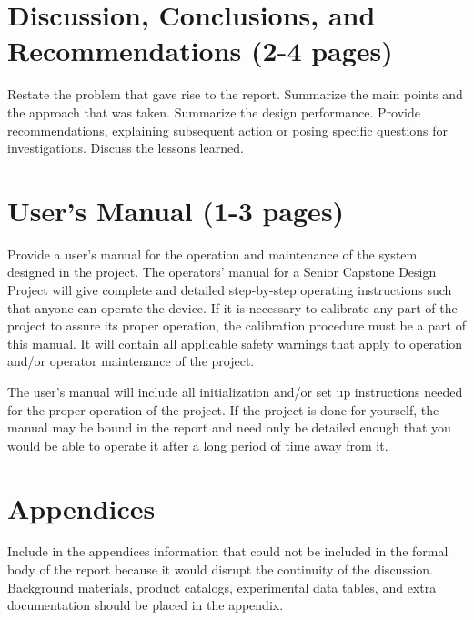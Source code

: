 \documentclass[12pt]{article}
\begin{document}
\section{Discussion, Conclusions, and Recommendations (2-4 pages)}
Restate the problem that gave rise to the report. Summarize the main points and the approach that was taken. Summarize the design performance. Provide recommendations, explaining subsequent action or posing specific questions for investigations. Discuss the lessons learned.

\section{User’s Manual (1-3 pages)}
Provide a user’s manual for the operation and maintenance of the system designed in the project. The operators' manual for a Senior Capstone Design Project will give complete and detailed step-by-step operating instructions such that anyone can operate the device. If it is necessary to calibrate any part of the project to assure its proper operation, the calibration procedure must be a part of this manual. It will contain all applicable safety warnings that apply to operation and/or operator maintenance of the project.

The user's manual will include all initialization and/or set up instructions needed for the proper operation of the project. If the project is done for yourself, the manual may be bound in the report and need only be detailed enough that you would be able to operate it after a long period of time away from it.

\section{Appendices}
Include in the appendices information that could not be included in the formal body of the report because it would disrupt the continuity of the discussion. Background materials, product catalogs, experimental data tables, and extra documentation should be placed in the appendix.
\end{document}
